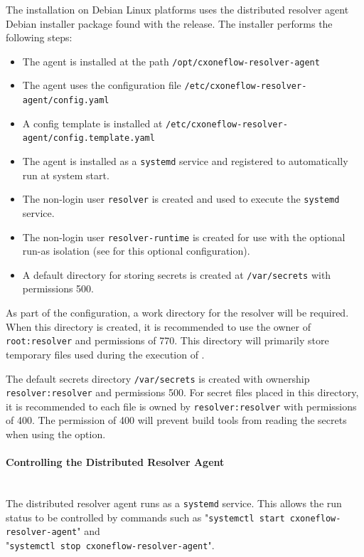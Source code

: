 The installation on Debian Linux platforms uses the distributed resolver agent Debian installer package
found with the \cxoneflow release.  The installer performs the following steps:

\begin{itemize}
  \item The agent is installed at the path \texttt{/opt/cxoneflow-resolver-agent}
  \item The agent uses the configuration file \texttt{/etc/cxoneflow-resolver-agent/config.yaml}
  \item A config template is installed at \texttt{/etc/cxoneflow-resolver-agent/config.template.yaml}
  \item The agent is installed as a \texttt{systemd} service and registered to automatically run at system start.
  \item The non-login user \texttt{resolver} is created and used to execute the \texttt{systemd} service.
  \item The non-login user \texttt{resolver-runtime} is created for use with the optional run-as isolation
    (see  for this optional configuration).
  \item A default directory for storing secrets is created at \texttt{/var/secrets} with permissions 500.
\end{itemize}

As part of the configuration, a work directory for the resolver will be required.  When this directory
is created, it is recommended to use the owner of \texttt{root:resolver} and permissions of 770.  This
directory will primarily store temporary files used during the execution of \scaresolver.

The default secrets directory \texttt{/var/secrets} is created with ownership \texttt{resolver:resolver} and
permissions 500.  For secret files placed in this directory, it is recommended to each file is owned
by \texttt{resolver:resolver} with permissions of 400.  The permission of 400 will prevent 
build tools from reading the secrets when using the  option.

\paragraph{Controlling the Distributed Resolver Agent}
\noindent\\The distributed resolver agent runs as a \texttt{systemd} service.  This allows the run status to be controlled
by commands such as "\texttt{systemctl start cxoneflow-resolver-agent}" and\\"\texttt{systemctl stop cxoneflow-resolver-agent}".


